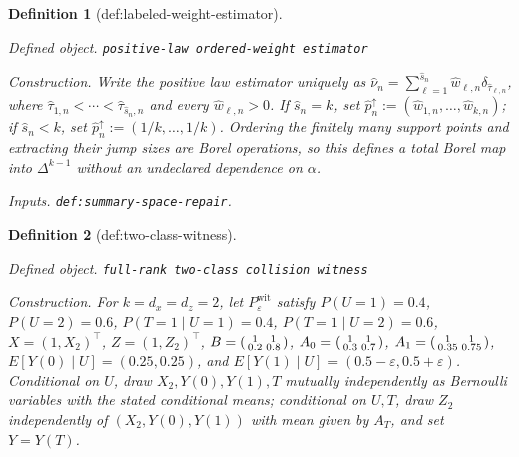 \documentclass{article}
\newtheorem{definition}{Definition}
\begin{document}
\begin{definition}[def:labeled-weight-estimator]\label{def:labeled-weight-estimator}
\par\smallskip\noindent\emph{Defined object.} \texttt{positive-\allowbreak{}law ordered-\allowbreak{}weight estimator}
\par\smallskip\noindent\emph{Construction.} Write the positive law estimator uniquely as \(\widehat\nu_n=\sum_{\ell=1}^{\widehat s_n}\widehat w_{\ell,n}\delta_{\widehat\tau_{\ell,n}}\), where \(\widehat\tau_{1,n}<\cdots<\widehat\tau_{\widehat s_n,n}\) and every \(\widehat w_{\ell,n}>0\). If \(\widehat s_n=k\), set \(\widehat p_n^{\uparrow}:=(\widehat w_{1,n},\ldots,\widehat w_{k,n})\); if \(\widehat s_n<k\), set \(\widehat p_n^{\uparrow}:=(1/k,\ldots,1/k)\). Ordering the finitely many support points and extracting their jump sizes are Borel operations, so this defines a total Borel map into \(\Delta^{k-1}\) without an undeclared dependence on \(\alpha\).
\par\smallskip\noindent\emph{Inputs.} \texttt{def:\allowbreak{}summary-\allowbreak{}space-\allowbreak{}repair}.
\end{definition}

\begin{definition}[def:two-class-witness]\label{def:two-class-witness}
\par\smallskip\noindent\emph{Defined object.} \texttt{full-\allowbreak{}rank two-\allowbreak{}class collision witness}
\par\smallskip\noindent\emph{Construction.} For \(k=d_x=d_z=2\), let \(P_{\varepsilon}^{\mathrm{wit}}\) satisfy \(P(U=1)=0.4\), \(P(U=2)=0.6\), \(P(T=1\mid U=1)=0.4\), \(P(T=1\mid U=2)=0.6\), \(X=(1,X_2)^\top\), \(Z=(1,Z_2)^\top\), \(B=\begin{psmallmatrix}1&1\\0.2&0.8\end{psmallmatrix}\), \(A_0=\begin{psmallmatrix}1&1\\0.3&0.7\end{psmallmatrix}\), \(A_1=\begin{psmallmatrix}1&1\\0.35&0.75\end{psmallmatrix}\), \(E[Y(0)\mid U]=(0.25,0.25)\), and \(E[Y(1)\mid U]=(0.5-\varepsilon,0.5+\varepsilon)\). Conditional on \(U\), draw \(X_2,Y(0),Y(1),T\) mutually independently as Bernoulli variables with the stated conditional means; conditional on \(U,T\), draw \(Z_2\) independently of \((X_2,Y(0),Y(1))\) with mean given by \(A_T\), and set \(Y=Y(T)\).
\end{definition}
\end{document}

